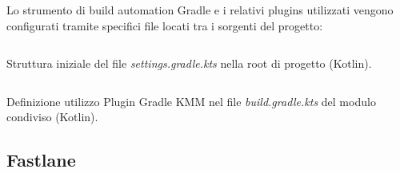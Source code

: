 Lo strumento di build automation Gradle e i relativi plugins utilizzati vengono configurati tramite specifici file locati tra i sorgenti del progetto:

\begin{listing}[H]
\inputminted{kotlin}{code/3-gradlekmm1}
\caption{Struttura iniziale del file \textit{settings.gradle.kts} nella root di progetto (Kotlin).}
\end{listing}

\begin{listing}[H]
\inputminted{kotlin}{code/3-gradlekmm2}
\caption{Definizione utilizzo Plugin Gradle KMM nel file \textit{build.gradle.kts} del modulo condiviso (Kotlin).}
\end{listing}

\subsection{Fastlane}


